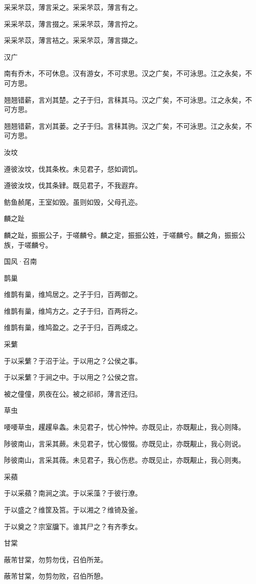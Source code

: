 采采芣苡，薄言采之。采采芣苡，薄言有之。

采采芣苡，薄言掇之。采采芣苡，薄言捋之。

采采芣苡，薄言袺之。采采芣苡，薄言擷之。

汉广

南有乔木，不可休息。汉有游女，不可求思。汉之广矣，不可泳思。江之永矣，不可方思。

翘翘错薪，言刈其楚。之子于归，言秣其马。汉之广矣，不可泳思。江之永矣，不可方思。

翘翘错薪，言刈其蒌。之子于归。言秣其驹。汉之广矣，不可泳思。江之永矣，不可方思。

汝坟

遵彼汝坟，伐其条枚。未见君子，惄如调饥。

遵彼汝坟，伐其条肄。既见君子，不我遐弃。

鲂鱼赪尾，王室如毁。虽则如毁，父母孔迩。

麟之趾

麟之趾，振振公子，于嗟麟兮。麟之定，振振公姓，于嗟麟兮。麟之角，振振公族，于嗟麟兮。




国风·召南


鹊巢

维鹊有巢，维鸠居之。之子于归，百两御之。

维鹊有巢，维鸠方之。之子于归，百两将之。

维鹊有巢，维鸠盈之。之子于归，百两成之。

采蘩

于以采蘩？于沼于沚。于以用之？公侯之事。

于以采蘩？于涧之中。于以用之？公侯之宫。

被之僮僮，夙夜在公。被之祁祁，薄言还归。

草虫

喓喓草虫，趯趯阜螽。未见君子，忧心忡忡。亦既见止，亦既觏止，我心则降。

陟彼南山，言采其蕨。未见君子，忧心惙惙。亦既见止，亦既觏止，我心则说。

陟彼南山，言采其薇。未见君子，我心伤悲。亦既见止，亦既觏止，我心则夷。

采蘋

于以采蘋？南涧之滨。于以采藻？于彼行潦。

于以盛之？维筐及筥。于以湘之？维锜及釜。

于以奠之？宗室牖下。谁其尸之？有齐季女。

甘棠

蔽芾甘棠，勿剪勿伐，召伯所茏。

蔽芾甘棠，勿剪勿败，召伯所憩。

